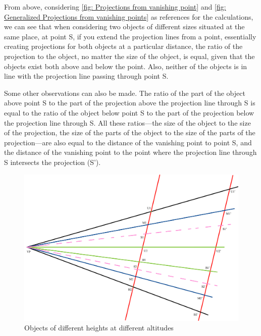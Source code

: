 From above, considering \ref{fig: Projections from vanishing point} and \ref{fig: Generalized Projections from vanishing points} as references for the calculations, we can see that when considering two objects of different sizes situated at the same place, at point S, if you extend the projection lines from a point, essentially creating projections for both objects at a particular distance, the ratio of the projection to the object, no matter the size of the object, is equal, given that the objects exist both above and below the point. Also, neither of the objects is in line with the projection line passing through point S.\newline

Some other observations can also be made. The ratio of the part of the object above point S to the part of the projection above the projection line through S is equal to the ratio of the object below point S to the part of the projection below the projection line through S. All these ratios—the size of the object to the size of the projection, the size of the parts of the object to the size of the parts of the projection—are also equal to the distance of the vanishing point to point S, and the distance of the vanishing point to the point where the projection line through S intersects the projection (S’).\newline

\begin{figure}[H]
    \centering
    \includegraphics[width=1.0\textwidth]{Calculations3.jpeg}
    \caption{Objects of different heights at different altitudes}
    \label{fig: Objects of different heights at different altitudes}
\end{figure}

